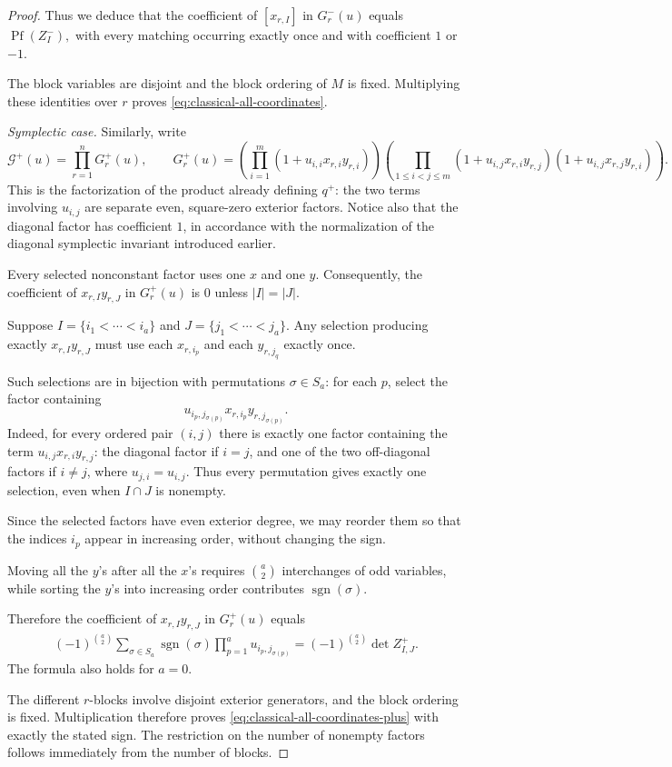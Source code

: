 \documentclass[10pt]{amsart}
\theoremstyle{definition}
\theoremstyle{remark}
\begin{document}
\begin{proof}
Thus we deduce that
the  coefficient  of   \([x_{r,I}] \) in \(G^-_r(u)\)   equals \(\operatorname{Pf}(Z^-_I),
\)
with every matching occurring exactly once and with
coefficient $1$ or $-1$.

The block variables are disjoint and the block ordering
of $M$ is fixed. Multiplying these identities over $r$
proves \eqref{eq:classical-all-coordinates}.

\medskip
\emph{Symplectic case.}
Similarly, write
\[
 \mathcal G^+(u)=\prod_{r=1}^nG^+_r(u),\qquad
 G^+_r(u)=
 \left(\prod_{i=1}^m(1+u_{i,i}x_{r,i}y_{r,i})\right)
 \left(\prod_{1\le i<j\le m}
     (1+u_{i,j}x_{r,i}y_{r,j})
     (1+u_{i,j}x_{r,j}y_{r,i})\right).
\]
This is the factorization of the product already defining
$q^+$: the two terms involving $u_{i,j}$ are separate even,
square-zero exterior factors. Notice also that the diagonal
factor has coefficient $1$, in accordance with the
normalization of the diagonal symplectic invariant
introduced earlier. 


Every selected nonconstant factor uses one $x$ and one
$y$. Consequently, the coefficient of
\(
 x_{r,I}y_{r,J}\) in $G^+_r(u)$ is  $0$
 unless \( |I|=|J|.\)

Suppose
$I=\{i_1<\cdots<i_a\}$ and
$J=\{j_1<\cdots<j_a\}$.
Any selection producing exactly $x_{r,I}y_{r,J}$
must use each $x_{r,i_p}$ and each $y_{r,j_q}$
exactly once.\smallskip

Such selections are in bijection with permutations
$\sigma\in S_a$: for each $p$, select the factor
containing
\[
 u_{i_p,j_{\sigma(p)}}x_{r,i_p}y_{r,j_{\sigma(p)}}.
\]
Indeed, for every ordered pair $(i,j)$ there is exactly
one factor containing the term $u_{i,j}x_{r,i}y_{r,j}$:
the diagonal factor if $i=j$, and one of the two
off-diagonal factors if $i\ne j$, where
$u_{j,i}=u_{i,j}$. Thus every permutation gives
exactly one selection, even when $I\cap J$ is nonempty.\smallskip



Since the selected factors have even exterior degree, we may reorder them so that the indices \(i_p\) appear in increasing order, without changing the sign.\smallskip


 Moving all the $y$'s after all the
$x$'s requires $\binom a2$ interchanges of odd
variables, while sorting the $y$'s into increasing
order contributes $\operatorname{sgn}(\sigma)$.

Therefore the coefficient of \(x_{r,I}y_{r,J}\) in \(G^+_r(u)\) equals
\[
\begin{aligned}
 (-1)^{\binom a2}
   \sum_{\sigma\in S_a}\operatorname{sgn}(\sigma)
     \prod_{p=1}^a u_{i_p,j_{\sigma(p)}} =(-1)^{\binom a2}\det Z^+_{I,J}.
\end{aligned}
\]
The formula also holds for $a=0$.\smallskip

The different $r$-blocks involve disjoint exterior
generators, and the block ordering is fixed.
Multiplication therefore proves
\eqref{eq:classical-all-coordinates-plus}
with exactly the stated sign. The restriction on the
number of nonempty factors follows immediately from
the number of blocks.

\end{proof}
\end{document}
